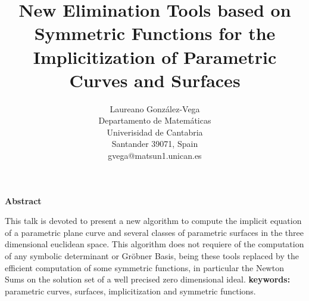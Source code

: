 \title{New Elimination Tools based on Symmetric Functions for the Implicitization of Parametric Curves and Surfaces}
\author{Laureano Gonz\'alez-Vega \\
Departamento de Matem\'aticas \\
Univerisidad de Cantabria \\
Santander 39071, Spain \\
gvega@matsun1.unican.es}



\date{} 
\pagestyle{empty}




\maketitle

\centerline{\bf Abstract}

\medskip
This talk is devoted to present a new algorithm to compute the implicit 
equation of a parametric plane curve and several classes of parametric 
surfaces in the three dimensional euclidean space. This algorithm does not 
requiere of the computation of any symbolic determinant or Gr\"obner Basis, 
being these tools replaced by the efficient computation of some symmetric 
functions, in particular the Newton Sums on the solution set of a well 
precised zero dimensional ideal.
\vspace{2 mm}
\newline
{\bf keywords:} parametric curves, surfaces, implicitization and symmetric 
functions. 

